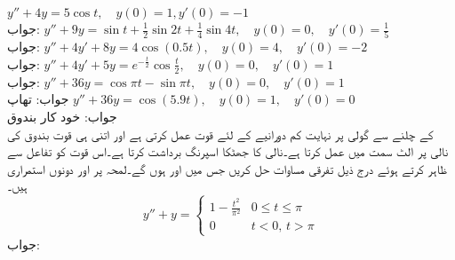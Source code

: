 \quad
$y''+4y=5\cos t,\quad y(0)=1,y'(0)=-1$\\
جواب:
\quad
$y''+9y=\sin t+\frac{1}{2}\sin 2t+\frac{1}{4}\sin 4t, \quad y(0)=0, \quad y'(0)=\frac{1}{5}$\\
جواب:
\quad
$y''+4y'+8y=4\cos( 0.5t), \quad y(0)=4, \quad y'(0)=-2$\\
جواب:
\quad
$y''+4y'+5y=e^{-\frac{t}{2}}\cos \frac{t}{2}, \quad y(0)=0, \quad y'(0)=1$\\
جواب:
\quad
$y''+36y=\cos \pi t-\sin \pi t, \quad y(0)=0, \quad y'(0)=1$\\
جواب:
\quad تھاپ \quad
$y''+36y=\cos (5.9t), \quad y(0)=1, \quad y'(0)=0$\\
جواب:
\quad خود کار بندوق \\
 کے چلنے سے گولی پر نہایت کم دورانیے کے لئے  قوت عمل کرتی ہے اور اتنی ہی قوت بندوق کی نالی پر الٹ سمت میں عمل کرتا ہے۔نالی کا جھٹکا اسپرنگ برداشت کرتا ہے۔اس قوت کو تفاعل  سے ظاہر کرتے ہوئے درج ذیل تفرقی مساوات حل کریں جس میں  اور  ہوں گے۔لمحہ  پر  اور  دونوں استمراری ہیں۔
\begin{equation*}
y''+y=
\begin{cases}
1-\frac{t^2}{\pi^2} & 0 \le t \le \pi\\
0 & t<0, \, t>\pi
\end{cases}
\end{equation*}
جواب:

